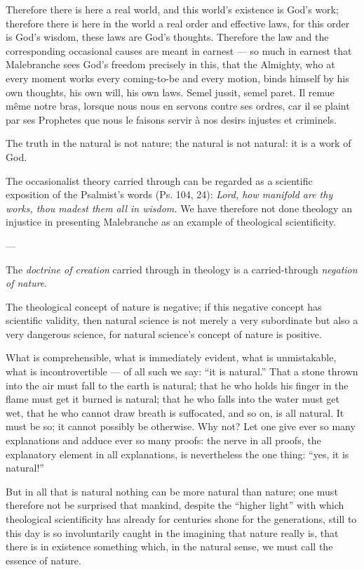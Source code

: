 \documentclass[12pt,a4paper]{article}
\begin{document}
Therefore there is here a real world, and this world's existence is God's work;
therefore there is here in the world a real order and effective laws, for this
order is God's wisdom, these laws are God's thoughts. Therefore the law and the
corresponding occasional causes are meant in earnest --- so much in earnest that
Malebranche sees God's freedom precisely in this, that the Almighty, who at every
moment works every coming-to-be and every motion, binds himself by his own
thoughts, his own will, his own laws. Semel jussit, semel paret. Il remue même
notre bras, lorsque nous nous en servons contre ses ordres, car il se plaint par
ses Prophetes que nous le faisons servir à nos desirs injustes et criminels.

The truth in the natural is not nature; the natural is not natural: it is a work of
God.

The occasionalist theory carried through can be regarded as a scientific exposition
of the Psalmist's words (Ps. 104, 24): \emph{Lord, how manifold are thy works, thou
madest them all in wisdom.}
We have therefore not done theology an injustice in presenting Malebranche as an
example of theological scientificity.

\begin{center}---\end{center}

The \emph{doctrine of creation} carried through in theology is a carried-through
\emph{negation of nature}.

The theological concept of nature is negative; if this negative concept has
scientific validity, then natural science is not merely a very subordinate but also
a very dangerous science, for natural science's concept of nature is positive.

What is comprehensible, what is immediately evident, what is unmistakable, what is
incontrovertible --- of all such we say: ``it is natural.'' That a stone thrown into
the air must fall to the earth is natural; that he who holds his finger in the flame
must get it burned is natural; that he who falls into the water must get wet, that
he who cannot draw breath is suffocated, and so on, is all natural. It must be so;
it cannot possibly be otherwise. Why not? Let one give ever so many explanations and
adduce ever so many proofs: the nerve in all proofs, the explanatory element in all
explanations, is nevertheless the one thing: ``yes, it is natural!''

But in all that is natural nothing can be more natural than nature; one must
therefore not be surprised that mankind, despite the ``higher light'' with which
theological scientificity has already for centuries shone for the generations, still
to this day is so involuntarily caught in the imagining that nature really is, that
there is in existence something which, in the natural sense, we must call the
essence of nature.
\end{document}
